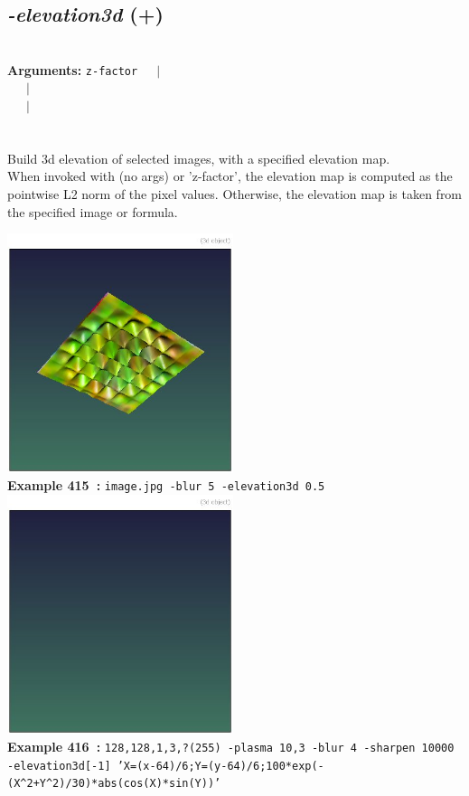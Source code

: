 \documentclass[a4paper,11pt,twoside]{book}
\begin{document}
\subsection{\emph{-elevation3d} (+)}\vspace*{-0.5em}
~\\\textbf{Arguments: } 
{\small \texttt{z-factor}}~~~$|$\\
~~~$|$\\
~~~$|$\\
\\~\\
Build 3d elevation of selected images, with a specified elevation map.
~\\When invoked with (no args) or 'z-factor', the elevation map is computed as the pointwise L2 norm of the
pixel values. Otherwise, the elevation map is taken from the specified image or formula.
\begin{center}\includegraphics[keepaspectratio=true,height=7cm,width=\textwidth]{img/gmic_def415.jpg}\\
{\footnotesize \textbf{Example 415~:} \texttt{image.jpg -blur 5 -elevation3d 0.5}}
\\\includegraphics[keepaspectratio=true,height=7cm,width=\textwidth]{img/gmic_def416.jpg}\\
{\footnotesize \textbf{Example 416~:} \texttt{128,128,1,3,?(255) -plasma 10,3 -blur 4 -sharpen 10000 -elevation3d[-1] 'X=(x-64)/6;Y=(y-64)/6;100*exp(-(X\textasciicircum 2+Y\textasciicircum 2)/30)*abs(cos(X)*sin(Y))'}}
\end{center}
\end{document}
